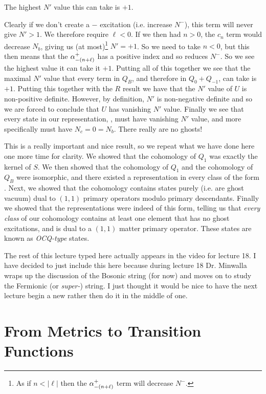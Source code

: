 \bcl 
    The highest $N'$ value this can take is $+1$. 
\ecl

\bq 
    Clearly if we don't create a $-$ excitation (i.e. increase $N^-$), this term will never give $N'>1$. We therefore require $\ell<0$. If we then had $n>0$, the $c_n$ term would decrease $N_b$, giving us (at most)\footnote{As if $n<|\ell|$ then the $\alpha^+_{-(n+\ell)}$ term will decrease $N^-$.} $N'=+1$. So we need to take $n<0$, but this then means that the $\alpha^+_{-(n+\ell)}$ has a positive index and so reduces $N^-$. So we see the highest value it can take it $+1$. 
\eq 
Putting all of this together we see that the maximal $N'$ value that every term in $Q_B$, and therefore in $Q_0+Q_{-1}$, can take is $+1$. Putting this together with the $R$ result we have that the $N'$ value of $U$ is non-positive definite. However, by definition, $N'$ is non-negative definite and so we are forced to conclude that $U$ has vanishing $N'$ value. Finally we see that  every state in our representation, , must have vanishing $N'$ value, and more specifically must have $N_c=0=N_b$. There really are no ghosts!

This is a really important and nice result, so we repeat what we have done here one more time for clarity. We showed that the cohomology of $Q_1$ was exactly the kernel of $S$. We then showed that the cohomology of $Q_1$ and the cohomology of $Q_B$ were isomorphic, and there existed a representation in every class of the form . Next, we showed that the cohomology contains states purely (i.e. are ghost vacuum) dual to $(1,1)$ primary operators modulo primary descendants. Finally we showed that the representations  were indeed of this form, telling us that \textit{every class} of our cohomology contains at least one element that has no ghost excitations, and is dual to a $(1,1)$ matter primary operator. These states are known as \textit{OCQ-type} states.

\br 
    The rest of this lecture typed here actually appears in the video for lecture 18. I have decided to just include this here because during lecture 18 Dr. Minwalla wraps up the discussion of the Bosonic string (for now) and moves on to study the Fermionic (or \textit{super-}) string. I just thought it would be nice to have the next lecture begin a new rather then do it in the middle of one. 
\er 

\section{From Metrics to Transition Functions}

